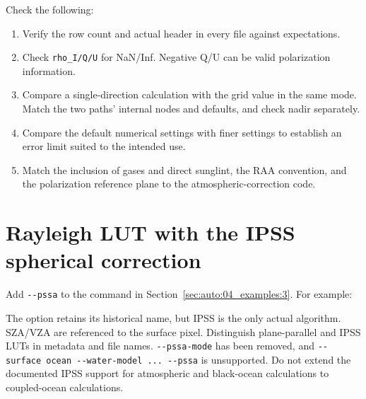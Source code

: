 Check the following:

\begin{enumerate}
\item Verify the row count and actual header in every file against expectations.
\item Check \texttt{rho\_\allowbreak{}I/\allowbreak{}Q/\allowbreak{}U} for NaN/Inf. Negative Q/U can be valid polarization information.
\item Compare a single-direction calculation with the grid value in the same mode. Match the two paths' internal nodes and defaults, and check nadir separately.
\item Compare the default numerical settings with finer settings to establish an error limit suited to the intended use.
\item Match the inclusion of gases and direct sunglint, the RAA convention, and the polarization reference plane to the atmospheric-correction code.
\end{enumerate}

\section{Rayleigh LUT with the IPSS spherical correction}
\label{sec:auto:04_examples:4}
Add \texttt{-\allowbreak{}-\allowbreak{}pssa} to the command in Section~\ref{sec:auto:04_examples:3}. For example:


\par\noindent\begin{minipage}{\linewidth}
\end{minipage}\par

The option retains its historical name, but IPSS is the only actual algorithm. SZA/VZA are referenced to the surface pixel. Distinguish plane-parallel and IPSS LUTs in metadata and file names. \texttt{-\allowbreak{}-\allowbreak{}pssa-\allowbreak{}mode} has been removed, and \texttt{-\allowbreak{}-\allowbreak{}surface ocean -\allowbreak{}-\allowbreak{}water-\allowbreak{}model .\allowbreak{}.\allowbreak{}.\allowbreak{} -\allowbreak{}-\allowbreak{}pssa} is unsupported. Do not extend the documented IPSS support for atmospheric and black-ocean calculations to coupled-ocean calculations.

